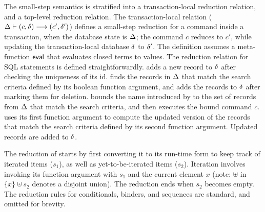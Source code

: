 The small-step semantics is stratified into a transaction-local
reduction relation, and a top-level reduction relation. The
transaction-local relation ($\Delta \vdash (c,\delta) \longrightarrow
(c',\delta')$) defines a small-step reduction for a command inside a
transaction, when the database state is $\Delta$; the command $c$
reduces to $c'$, while updating the transaction-local database $\delta$
to $\delta'$. The definition assumes a meta-function $\textsf{eval}$ that
evaluates closed terms to values. The reduction relation for SQL
statements is defined straightforwardly.  adds a new record
to $\delta$ after checking the uniqueness of its id.  finds
the records in $\Delta$ that match the search criteria defined by its
boolean function argument, and adds the records to $\delta$ after
marking them for deletion.  bounds the name introduced by
 to the set of records from $\Delta$ that match the search
criteria, and then executes the bound command $c$.  uses its
first function argument to compute the updated version of the records
that match the search criteria defined by its second function
argument. Updated records are added to $\delta$.

The reduction of  starts by first converting it to its
run-time form to keep track of iterated items ($s_1$), as well as
yet-to-be-iterated items ($s_2$).  Iteration involves invoking its
function argument with $s_1$ and the current element $x$ (note:
$\uplus$ in $\{x\} \uplus s_2$ denotes a disjoint union). The
reduction ends when $s_2$ becomes empty. The reduction rules for
conditionals,  binders, and sequences are standard, and
omitted for brevity.

